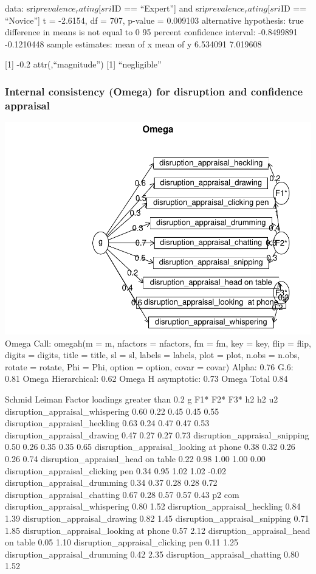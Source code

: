 \documentclass[
]{article}
\begin{document}
data: sri\(prevalence_rating[sri\)ID == ``Expert''{]} and
sri\(prevalence_rating[sri\)ID == ``Novice''{]} t = -2.6154, df = 707,
p-value = 0.009103 alternative hypothesis: true difference in means is
not equal to 0 95 percent confidence interval: -0.8499891 -0.1210448
sample estimates: mean of x mean of y 6.534091 7.019608

{[}1{]} -0.2 attr(,``magnitude'') {[}1{]} ``negligible''

\subsubsection{Internal consistency (Omega) for disruption and
confidence
appraisal}\label{internal-consistency-omega-for-disruption-and-confidence-appraisal}

\includegraphics{expertise_2024_09_26_no_outlierdetection_MK_files/figure-latex/sri_omega-1.pdf}
Omega Call: omegah(m = m, nfactors = nfactors, fm = fm, key = key, flip
= flip, digits = digits, title = title, sl = sl, labels = labels, plot =
plot, n.obs = n.obs, rotate = rotate, Phi = Phi, option = option, covar
= covar) Alpha: 0.76 G.6: 0.81 Omega Hierarchical: 0.62 Omega H
asymptotic: 0.73 Omega Total 0.84

Schmid Leiman Factor loadings greater than 0.2 g F1* F2* F3* h2 h2 u2
disruption\_appraisal\_whispering 0.60 0.22 0.45 0.45 0.55
disruption\_appraisal\_heckling 0.63 0.24 0.47 0.47 0.53
disruption\_appraisal\_drawing 0.47 0.27 0.27 0.73
disruption\_appraisal\_snipping 0.50 0.26 0.35 0.35 0.65
disruption\_appraisal\_looking at phone 0.38 0.32 0.26 0.26 0.74
disruption\_appraisal\_head on table 0.22 0.98 1.00 1.00 0.00
disruption\_appraisal\_clicking pen 0.34 0.95 1.02 1.02 -0.02
disruption\_appraisal\_drumming 0.34 0.37 0.28 0.28 0.72
disruption\_appraisal\_chatting 0.67 0.28 0.57 0.57 0.43 p2 com
disruption\_appraisal\_whispering 0.80 1.52
disruption\_appraisal\_heckling 0.84 1.39 disruption\_appraisal\_drawing
0.82 1.45 disruption\_appraisal\_snipping 0.71 1.85
disruption\_appraisal\_looking at phone 0.57 2.12
disruption\_appraisal\_head on table 0.05 1.10
disruption\_appraisal\_clicking pen 0.11 1.25
disruption\_appraisal\_drumming 0.42 2.35
disruption\_appraisal\_chatting 0.80 1.52
\end{document}
